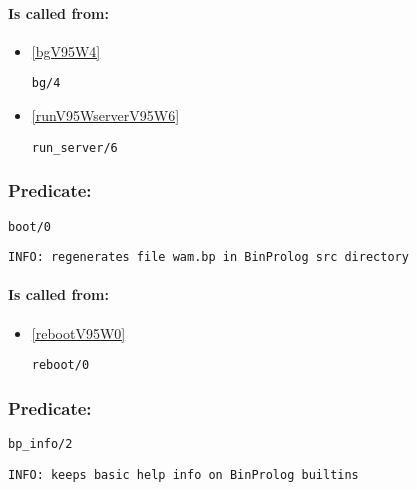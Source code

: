\paragraph{Is called from:} 
\begin{itemize}
\item \ref{bgV95W4} 
\begin{verbatim}
bg/4
\end{verbatim}

\item \ref{runV95WserverV95W6} 
\begin{verbatim}
run_server/6
\end{verbatim}

\end{itemize}

\subsubsection{Predicate:} \label{bootV95W0}

\begin{verbatim}
boot/0
\end{verbatim}

{\small \begin{verbatim}
INFO: regenerates file wam.bp in BinProlog src directory

\end{verbatim}}
\paragraph{Is called from:} 
\begin{itemize}
\item \ref{rebootV95W0} 
\begin{verbatim}
reboot/0
\end{verbatim}

\end{itemize}

\subsubsection{Predicate:} \label{bpV95WinfoV95W2}

\begin{verbatim}
bp_info/2
\end{verbatim}

{\small \begin{verbatim}
INFO: keeps basic help info on BinProlog builtins

\end{verbatim}}
